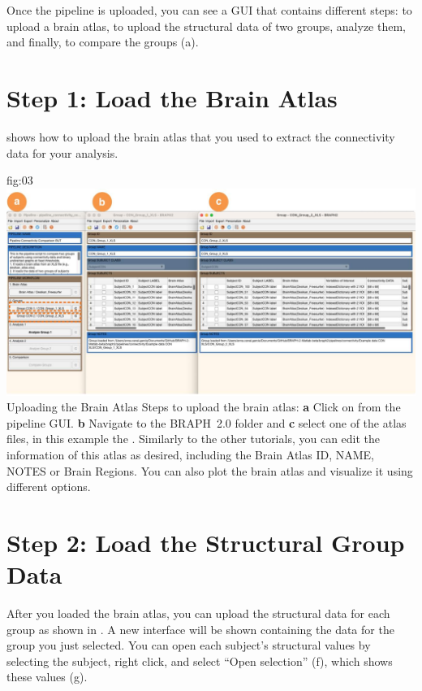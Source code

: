 \documentclass[justified]{tufte-handout}
\begin{document}
Once the pipeline is uploaded, you can see a GUI that contains different steps: to upload a brain atlas, to upload the structural data of two groups, analyze them, and finally, to compare the groups (a). 

\section{Step 1: Load the Brain Atlas}

 shows how to upload the brain atlas that you used to extract the connectivity data for your analysis.

	{fig:03}
	{
	\includegraphics{fig03.jpg}
	}
	{Uploading the Brain Atlas}
	{
	Steps to upload the brain atlas:
	{\bf a} Click on  from the pipeline GUI.
	{\bf b} Navigate to the BRAPH~2.0 folder  and {\bf c} select one of the atlas files, in this example the . Similarly to the other tutorials, you can edit the information of this atlas as desired, including the Brain Atlas ID, NAME, NOTES or Brain Regions. You can also plot the brain atlas and visualize it using different options.
	}
 
\section{Step 2: Load the Structural Group Data}

After you loaded the brain atlas, you can upload the structural data for each group as shown in . A new interface will be shown containing the data for the group you just selected. You can open each subject’s structural values by selecting
the subject, right click, and select “Open selection” (f), which shows these values (g). 
	
\end{document}
